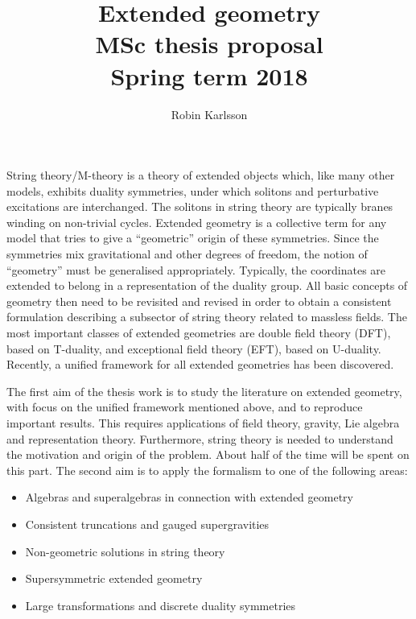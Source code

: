 \documentclass{article}
\title{Extended geometry\\
\large{MSc thesis proposal\\Spring term 2018}}
\author{Robin Karlsson}
\date{\nodate}
\begin{document}
\maketitle


String theory/M-theory is a theory of extended objects which, like many other models, exhibits duality symmetries, under which solitons and perturbative excitations are interchanged. The solitons in string theory are typically branes winding on non-trivial cycles. Extended geometry is a collective term for any model that tries to give a “geometric” origin of these symmetries. Since the symmetries mix gravitational and other degrees of freedom, the notion of “geometry” must be generalised appropriately. Typically, the coordinates are extended to belong in a representation of the duality group. All basic concepts of geometry then need to be revisited and revised in order to obtain a consistent formulation describing a subsector of string theory related to massless fields. The most important classes of extended geometries are double field theory (DFT), based on T-duality, and exceptional field theory (EFT), based on U-duality. Recently, a unified framework for all extended geometries has been discovered.

The first aim of the thesis work is to study the literature on extended geometry, with focus on the unified framework mentioned above, and to reproduce important results. This requires applications of field theory, gravity, Lie algebra and representation theory. Furthermore, string theory is needed to understand the motivation and origin of the problem. About half of the time will be spent on this part. 
The second aim is to apply the formalism to one of the following areas:
\begin{itemize}
\item Algebras and superalgebras in connection with extended geometry
\item Consistent truncations and gauged supergravities
\item Non-geometric solutions in string theory 
\item Supersymmetric extended geometry
\item Large transformations and discrete duality symmetries
\end{itemize}

%
%
\end{document}
